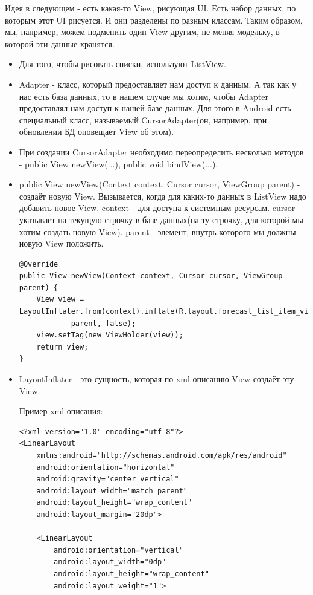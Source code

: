 \documentclass[12 pt]{article}
\begin{document}
    Идея в следующем - есть какая-то View, рисующая UI. Есть набор данных, по которым этот UI рисуется. И они разделены по разным классам. Таким образом, мы, например, можем подменить один View другим, не меняя модельку, в которой эти данные хранятся.

    \begin{itemize}
        \item Для того, чтобы рисовать списки, используют ListView.
        \item Adapter - класс, который предоставляет нам доступ к данным. А так как у нас есть база данных, то в нашем случае мы хотим, чтобы Adapter предоставлял нам доступ к нашей базе данных. Для этого в Android есть специальный класс, называемый CursorAdapter(он, например, при обновлении БД оповещает View об этом).
        \item При создании CursorAdapter необходимо переопределить несколько методов - public View newView(...), public void bindView(...).
        \item public View newView(Context context, Cursor cursor, ViewGroup parent) - создаёт новую View. Вызывается, когда для каких-то данных в ListView надо добавить новое View. context - для доступа к системным ресурсам. cursor - указывает на текущую строчку в базе данных(на ту строчку, для которой мы хотим создать новую View). parent - элемент, внутрь которого мы должны новую View положить.
        \begin{lstlisting}
@Override
public View newView(Context context, Cursor cursor, ViewGroup parent) {
    View view = LayoutInflater.from(context).inflate(R.layout.forecast_list_item_view,
            parent, false);
    view.setTag(new ViewHolder(view));
    return view;
}        
        \end{lstlisting}
        \item LayoutInflater - это сущность, которая по xml-описанию View создаёт эту View. 
        
        Пример xml-описания:
        \begin{lstlisting}
<?xml version="1.0" encoding="utf-8"?>
<LinearLayout
    xmlns:android="http://schemas.android.com/apk/res/android"
    android:orientation="horizontal"
    android:gravity="center_vertical"
    android:layout_width="match_parent"
    android:layout_height="wrap_content"
    android:layout_margin="20dp">

    <LinearLayout
        android:orientation="vertical"
        android:layout_width="0dp"
        android:layout_height="wrap_content"
        android:layout_weight="1">


\end{lstlisting}
\end{itemize}
\end{document}
